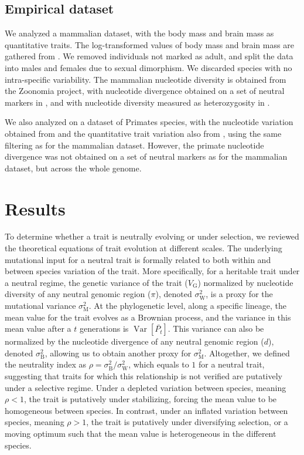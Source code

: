 \documentclass{article}
\DeclareMathOperator{\Var}{\text{Var}}
\newcommand{\Time}{t}
\newcommand{\Trait}{P}
\newcommand{\MeanTrait}{\bar{\Trait_{\Time}}}
\newcommand{\VarPhy}{\Var \left[\MeanTrait\right]}
\newcommand{\VarGenetic}{V_{\mathrm{G}}}
\newcommand{\RateMut}{\sigma^2_{\mathrm{M}}}
\newcommand{\RateBetween}{\sigma^2_{\mathrm{B}}}
\newcommand{\RateWhithin}{\sigma^2_{\mathrm{W}}}
\newcommand{\NI}{\rho}
\begin{document}
\subsection*{Empirical dataset}\label{subsec:empirical-dataset}

We analyzed a mammalian dataset, with the body mass and brain mass as quantitative traits.
The log-transformed values of body mass and brain mass are gathered from \textcite{tsuboi_breakdown_2018}.
We removed individuals not marked as adult, and split the data into males and females due to sexual dimorphism.
We discarded species with no intra-specific variability.
The mammalian nucleotide diversity is obtained from the Zoonomia project, with nucleotide divergence obtained on a set of neutral markers in \textcite{foley_genomic_2023}, and with nucleotide diversity measured as heterozygosity in \textcite{wilder_contribution_2023}.


We also analyzed on a dataset of Primates species, with the nucleotide variation obtained from \textcite{kuderna_global_2023} and the quantitative trait variation also from \textcite{tsuboi_breakdown_2018}, using the same filtering as for the mammalian dataset.
However, the primate nucleotide divergence was not obtained on a set of neutral markers as for the mammalian dataset, but across the whole genome.

\section*{Results}\label{sec:results}

To determine whether a trait is neutrally evolving or under selection, we reviewed the theoretical equations of trait evolution at different scales.
The underlying mutational input for a neutral trait is formally related to both within and between species variation of the trait.
More specifically, for a heritable trait under a neutral regime, the genetic variance of the trait ($\VarGenetic$) normalized by nucleotide diversity of any neutral genomic region ($\pi$), denoted $\RateWhithin$, is a proxy for the mutational variance $\RateMut$.
At the phylogenetic level, along a specific lineage, the mean value for the trait evolves as a Brownian process, and the variance in this mean value after a $\Time$ generations is $\VarPhy$.
This variance can also be normalized by the nucleotide divergence of any neutral genomic region ($d$), denoted $\RateBetween$, allowing us to obtain another proxy for $\RateMut$.
Altogether, we defined the neutrality index as $\NI = \RateBetween/\RateWhithin$, which equals to $1$ for a neutral trait, suggesting that traits for which this relationship is not verified are putatively under a selective regime.
Under a depleted variation between species, meaning $\NI < 1$, the trait is putatively under stabilizing, forcing the mean value to be homogeneous between species.
In contrast, under an inflated variation between species, meaning $\NI > 1$, the trait is putatively under diversifying selection, or a moving optimum such that the mean value is heterogeneous in the different species.
\end{document}
